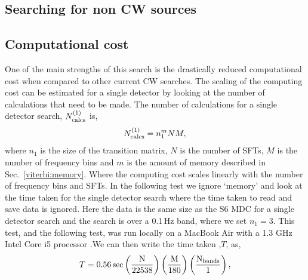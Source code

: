 \subsection{\label{viterbi:sens:other} Searching for non CW sources}



\subsection{\label{results:time}Computational cost}

One of the main strengths of this search is the drastically reduced computational cost when compared to other current \ac{CW} searches.
The scaling of the computing cost can be estimated for a single detector by looking at the number of calculations that need to be made. 
The number of calculations for a single detector search, $N^{(1)}_{\rm{calcs}}$ is,
\begin{equation}
\label{results:time:singlecalc}
N^{(1)}_{\rm{calcs}} = n_{1}^{m}NM,
\end{equation}
where $n_1$ is the size of the transition matrix, $N$ is the number of \acp{SFT}, $M$ is the number of frequency bins and $m$ is the amount of memory described in Sec.~\ref{viterbi:memory}. Where the computing cost scales linearly with the number of frequency bins and \acp{SFT}.
In the following test we ignore `memory' and look at the time taken for the single detector search where the time taken to read and save data is ignored. Here the data is the same size as the S6 \ac{MDC} for a single detector search and the search is over a 0.1\,Hz band, where we set $n_1=3$. This test, and the following test, was run locally on a MacBook Air with a 1.3 GHz Intel Core i5 processor .We can then write the time taken ,$T$, as,
%
\begin{equation}
T = 0.56\,\rm{sec}\left( \frac{N}{22538}\right) \left( \frac{M}{180}\right) \left( \frac{N_{\rm{bands}}}{1}\right),
\end{equation}


